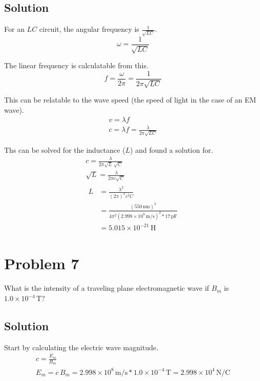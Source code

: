 \documentclass[12pt]{article}
\newcommand{\E}[1]{\times 10^{#1}}
\begin{document}
        \subsection{Solution}
            For an $LC$ circuit, the angular frequency is $\frac{1}{\sqrt{LC}}$.
            \begin{equation}
                \omega  =   \frac{1}{\sqrt{LC}}
            \end{equation}

            The linear frequency is calculatable from this.
            \begin{equation}
                f   =   \frac{\omega}{2\pi}
                    =   \frac{1}{2\pi\sqrt{LC}}
            \end{equation}

            This can be relatable to the wave speed (the speed of light in the case of an EM wave).
            \begin{gather}
                v   =   \lambda f\\
                c   =   \lambda f
                    =   \frac{\lambda}{2\pi\sqrt{LC}}
            \end{gather}

            Ths can be solved for the inductance ($L$) and found a solution for.
            \begin{gather}
                c   =   \frac{\lambda}{2\pi\sqrt{L}\,\sqrt{C}}\\
                \sqrt{L}    =   \frac{\lambda}{2\pi c\sqrt{C}}\\
                \begin{align}
                    L   &=  \frac{\lambda^2}{(2\pi)^2 c^2 C}\\
                        &=  \frac{(550\,\unit{\nano\meter})^2}{4\pi^2 (2.998\E{8}\,\unit{\meter/\second})^2 * 17\,\unit{\pico\farad}}\\
                        &=  \boxed{5.015\E{-21}\,\unit{\henry}}
                \end{align}
            \end{gather}

    \pagebreak
    \section{Problem 7}
        What is the intensity of a traveling plane electromagnetic wave if $B_m$ is $1.0\E{-4}\,\unit{\tesla}$?

        \subsection{Solution}
            Start by calculating the electric wave magnitude.
            \begin{gather}
                c   =   \frac{E_m}{B_m}\\
                E_m =   c\,B_m
                    =   2.998\E{8}\,\unit{\meter/\second} * 1.0\E{-4}\,\unit{\tesla}
                    =   2.998\E{4}\,\unit{\newton/\coulomb}
            \end{gather}
\end{document}
